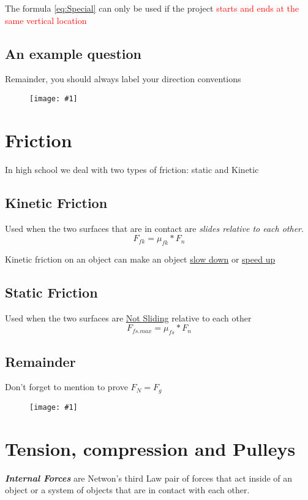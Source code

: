 \documentclass[10pt]{report}
\theoremstyle{remark}
\newcommand{\mypic}[3]{
    \begin{figure}[h!]
        \centering
        \texttt{[image: \#1]}
        \caption{#2}
    \end{figure}
}
\begin{document}
The formula \ref{eq:Special} can only be used if the project \textcolor{red}{starts and ends at the same vertical location}
\newpage
\subsection{An example question}
Remainder, you should always label your direction conventions

\mypic{graph/projectileReview.png}{}{0.8}

\section{Friction}
In high school we deal with two types of friction: static and Kinetic

\subsection{Kinetic Friction}
Used when the two surfaces that are in contact are \textit{slides relative to each other}.
\begin{equation}
    F_{fk} = \mu_{fk} * F_{n}
\end{equation}

Kinetic friction on an object can make an object \underline{slow down} or \underline{speed up}

\subsection{Static Friction}
Used when the two surfaces are \underline{Not Sliding} relative to each other
\begin{equation}
    F_{fs.max} = \mu_{fs} * F_{n}
\end{equation}

\subsection{Remainder}
Don't forget to mention to prove \underline{$F_{N} = F_{g}$}
\mypic{graph/example9.png}{}{0.7}

\section{Tension, compression and Pulleys}
\textbf{\textit{Internal Forces}} are Netwon's third Law pair of forces that act inside of an object or a system of objects
that are in contact with each other. \\
\end{document}
